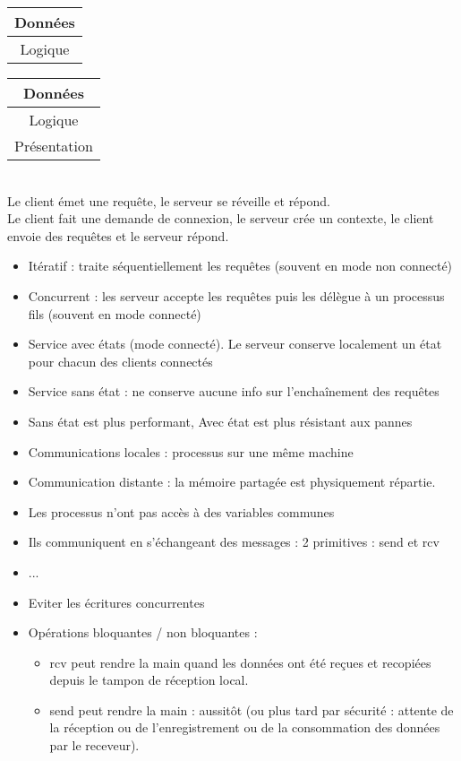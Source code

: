 \begin{tabular}{|c|}
Données \\ \hline Logique \\ \hline
\end{tabular}
\begin{tabular}{|c|}
Données \\ \hline Logique \\ \hline Présentation \\ \hline
\end{tabular}
\\
 Le client émet une requête, le serveur se réveille et répond. \\
 Le client fait une demande de connexion, le serveur crée un contexte, le client envoie des requêtes et le serveur répond.\\
\begin{itemize}
	\item Itératif : traite séquentiellement les requêtes (souvent en mode non connecté)
	\item Concurrent : les serveur accepte les requêtes puis les délègue à un processus fils (souvent en mode connecté)
\end{itemize}
\begin{itemize}
	\item Service avec états (mode connecté). Le serveur conserve localement un état pour chacun des clients connectés
	\item Service sans état : ne conserve aucune info sur l'enchaînement des requêtes
	\item Sans état est plus performant, Avec état est plus résistant aux pannes
\end{itemize}
\begin{itemize}
	\item Communications locales : processus sur une même machine
	\item Communication distante : la mémoire partagée est physiquement répartie.
\end{itemize}
\begin{itemize}
	\item Les processus n'ont pas accès à des variables communes
	\item Ils communiquent en s'échangeant des messages : 2 primitives : send et rcv
	\item ...
	\item Eviter les écritures concurrentes
	\item Opérations bloquantes / non bloquantes :
		\begin{itemize}
			\item rcv peut rendre la main quand les données ont été reçues et recopiées depuis le tampon de réception local.
			\item send peut rendre la main : aussitôt (ou plus tard par sécurité : attente de la réception ou de l'enregistrement ou de la consommation des données par le receveur).
		\end{itemize}
\end{itemize}


